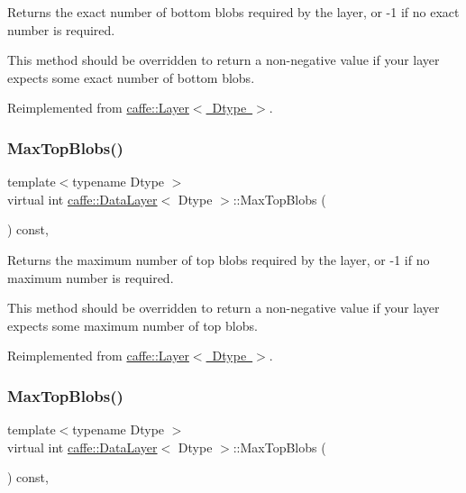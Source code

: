 Returns the exact number of bottom blobs required by the layer, or -\/1 if no exact number is required. 

This method should be overridden to return a non-\/negative value if your layer expects some exact number of bottom blobs. 

Reimplemented from \mbox{\hyperlink{classcaffe_1_1_layer_a8e5ee0494d85f5f55fc4396537cbc60f}{caffe\+::\+Layer$<$ Dtype $>$}}.

\mbox{\label{classcaffe_1_1_data_layer_ac47e9f3bff3db9d7364f6c392427745c}} 
\subsubsection{\texorpdfstring{Max\+Top\+Blobs()}{MaxTopBlobs()}\hspace{0.1cm}{\footnotesize\ttfamily [1/2]}}
{\footnotesize\ttfamily template$<$typename Dtype $>$ \\
virtual int \mbox{\hyperlink{classcaffe_1_1_data_layer}{caffe\+::\+Data\+Layer}}$<$ Dtype $>$\+::Max\+Top\+Blobs (\begin{DoxyParamCaption}{ }\end{DoxyParamCaption}) const\hspace{0.3cm}{\ttfamily [inline]}, {\ttfamily [virtual]}}



Returns the maximum number of top blobs required by the layer, or -\/1 if no maximum number is required. 

This method should be overridden to return a non-\/negative value if your layer expects some maximum number of top blobs. 

Reimplemented from \mbox{\hyperlink{classcaffe_1_1_layer_ac6c03df0b6e40e776c94001e19994a2e}{caffe\+::\+Layer$<$ Dtype $>$}}.

\mbox{\label{classcaffe_1_1_data_layer_ac47e9f3bff3db9d7364f6c392427745c}} 
\subsubsection{\texorpdfstring{Max\+Top\+Blobs()}{MaxTopBlobs()}\hspace{0.1cm}{\footnotesize\ttfamily [2/2]}}
{\footnotesize\ttfamily template$<$typename Dtype $>$ \\
virtual int \mbox{\hyperlink{classcaffe_1_1_data_layer}{caffe\+::\+Data\+Layer}}$<$ Dtype $>$\+::Max\+Top\+Blobs (\begin{DoxyParamCaption}{ }\end{DoxyParamCaption}) const\hspace{0.3cm}{\ttfamily [inline]}, {\ttfamily [virtual]}}



